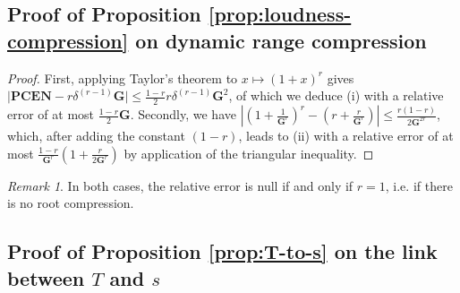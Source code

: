 \documentclass[journal]{IEEEtran}
\makeatletter
\newcommand*{\ie}{i.e.\@\xspace}
\newtheorem*{prop*}{Proposition}
\theoremstyle{remark}
\newtheorem*{remark}{Remark}
\makeatother
\begin{document}
\subsection{Proof of Proposition \ref{prop:loudness-compression} on dynamic range compression}


\begin{proof}
First, applying Taylor's theorem to $x \mapsto (1+x)^r$ gives
$\vert \mathbf{PCEN} - r \delta^{(r-1)} \mathbf{G} \vert \leq \frac{1-r}{2} r \delta^{(r-1)} \mathbf{G}^2$, of which we deduce (i) with a relative error of at most $\frac{1-r}{2} \mathbf{G}$.
Secondly, we have
$\left \vert \left(1 + \frac{1}{\mathbf{G}^r}\right)^r - \left(r + \frac{r}{\mathbf{G}^r} \right)\right \vert \leq \frac{r(1-r)}{2\mathbf{G}^{2r}}$, which, after adding the constant $(1-r)$, leads to (ii) with a relative error of at most $\frac{1-r}{\mathbf{G}^r} (1+\frac{r}{2\mathbf{G}^r})$ by application of the triangular inequality.
\end{proof}

\begin{remark}
In both cases, the relative error is null if and only if $r=1$, \ie{} if there is no root compression.
\end{remark}


\subsection{Proof of Proposition \ref{prop:T-to-s} on the link between $T$ and $s$}

\end{document}
